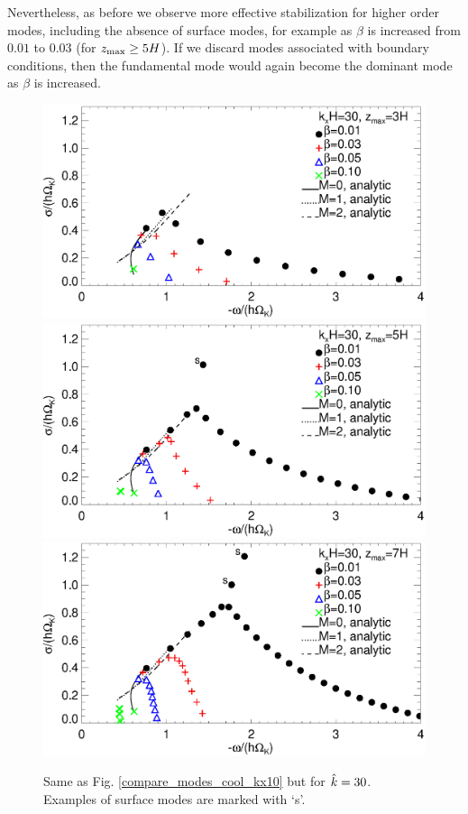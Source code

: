 Nevertheless, as before we observe more effective stabilization for
higher order modes, including the absence of surface modes, for
example as $\beta$ is increased from $0.01$ to $0.03$ (for $z_\mathrm{max}\geq
5H$). If we discard modes associated with boundary conditions, then
the fundamental mode would again become the dominant mode as $\beta$ is
increased. 

\begin{figure}
  \includegraphics[width=\linewidth,clip=true,trim=0cm 1.75cm 0cm
  0cm]{figures/compare_modes_cool_kx30_z3_analytic.ps} 
  \includegraphics[width=\linewidth,clip=true,trim=0cm 1.75cm 0cm
  0cm]{figures/compare_modes_cool_kx30_z5_analytic.ps}
  \includegraphics[width=\linewidth]{figures/compare_modes_cool_kx30_z7_analytic.ps}
  \caption{Same as Fig. \ref{compare_modes_cool_kx10} but for
    $\hat{k}=30$. Examples of surface modes are marked with `s'. 
    \label{compare_modes_cool_kx30} 
  }
\end{figure}

